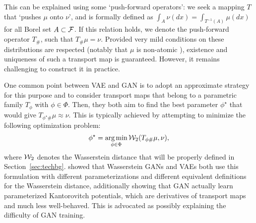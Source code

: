 
%
This can be explained using some `push-forward operators': we seek a mapping $T$ that `pushes $\mu$ onto $\nu$', and is formally defined as $\int_A \nu(dx) = \int_{T^{-1}(A)} \mu(dx) $ for all Borel set $A \subset \mathcal{F}$. If this relation holds, we denote the push-forward operator $T_\#$, such that $T_\# \mu = \nu$. Provided very mild conditions on these distributions are respected (notably that $\mu$ is non-atomic \cite{villani2008optimal}), existence and uniqueness of such a transport map is guaranteed. However, it remains challenging to construct it in practice.

One common point between VAE and GAN is to adopt an approximate strategy for this purpose and to consider transport maps that belong to a parametric family $T_{\phi}$ with $\phi \in \Phi$. Then, they both aim to find the best parameter $\phi^\star$ that would give $T_{\phi^\star \#}\mu \approx \nu$. This is typically achieved by attempting to minimize the following optimization problem:
\begin{align}
\phi^\star = \operatorname*{arg\min}_{\phi \in \Phi} {\cal W}_2(T_{\phi \#}\mu, \nu),
\end{align}
where ${\cal W}_2$ denotes the Wasserstein distance that will be properly defined in Section~\ref{sec:techbg}.  \cite{genevay2017gan} showed that Wasserstein GANs \cite{arjovsky2017wasserstein} and VAEs both use this formulation with different parameterizations and different equivalent definitions for the Wasserstein distance, additionally showing that GAN actually learn parameterized Kantorovitch potentials, which are derivatives of transport maps and much less well-behaved. This is advocated as possibly explaining the difficulty of GAN training.

